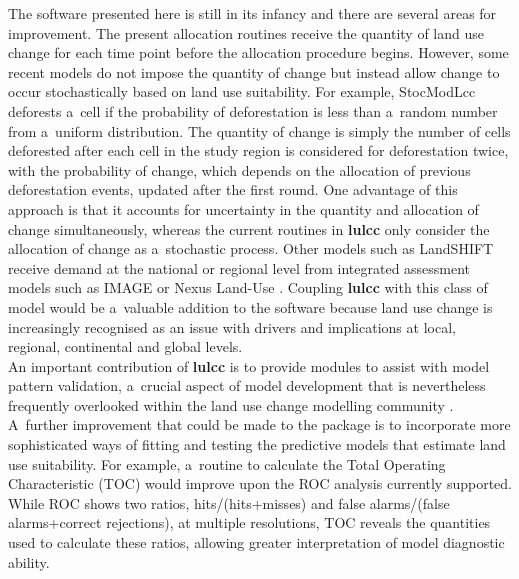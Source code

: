 \documentclass{icldt}\usepackage[]{graphicx}\usepackage[]{color}
\begin{document}
The software presented here is still in its infancy and there are several areas for improvement. The present allocation routines receive the quantity of land use change for each time point before the allocation procedure begins. However, some recent models do not impose the quantity of change but instead allow change to occur stochastically based on land use suitability. For example, StocModLcc \citep{rosa2013} deforests a~cell if the probability of deforestation is less than a~random number from a~uniform distribution. The quantity of change is simply the number of cells deforested after each cell in the study region is considered for deforestation twice, with the probability of change, which depends on the allocation of previous deforestation events, updated after the first round. One advantage of this approach is that it accounts for uncertainty in the quantity and allocation of change simultaneously, whereas the current routines in \textbf{lulcc} only consider the allocation of change as a~stochastic process. Other models such as LandSHIFT \citep{schaldach2011} receive demand at the national or regional level from integrated assessment models such as IMAGE \citep{stehfast2014} or Nexus Land-Use \citep{souty2012}. Coupling \textbf{lulcc} with this class of model would be a~valuable addition to the software because land use change is increasingly recognised as an issue with drivers and implications at local, regional, continental and global levels. \\

An important contribution of \textbf{lulcc} is to provide modules to assist with model pattern validation, a~crucial aspect of model development that is nevertheless frequently overlooked within the land use change modelling community \citep{rosa2014}. A~further improvement that could be made to the package is to incorporate more sophisticated ways of fitting and testing the predictive models that estimate land use suitability. For example, a~routine to calculate the Total Operating Characteristic (TOC) \citep{pontius2014} would improve upon the ROC analysis currently supported. While ROC shows two ratios, hits/(hits+misses) and false alarms/(false alarms+correct rejections), at multiple resolutions, TOC reveals the quantities used to calculate these ratios, allowing greater interpretation of model diagnostic ability. \\
\end{document}
